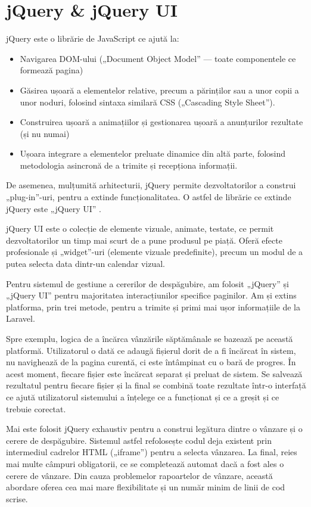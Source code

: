 \section{jQuery \& jQuery UI}

	jQuery este o librărie de JavaScript ce ajută la: \cite{jquery}
	\begin{itemize}
		\item Navigarea DOM-ului („Document Object Model” --- toate componentele ce formează pagina)
		\item Găsirea ușoară a elementelor relative, precum a părinților sau a unor copii a unor noduri, folosind sintaxa similară CSS („Cascading Style Sheet”).
		\item Construirea ușoară a animațiilor și gestionarea ușoară a anunțurilor rezultate (și nu numai)
		\item Ușoara integrare a elementelor preluate dinamice din altă parte, folosind metodologia asincronă de a trimite și recepționa informații.
	\end{itemize}

	De asemenea, mulțumită arhitecturii, jQuery permite dezvoltatorilor a construi „plug-in”-uri, pentru a extinde funcționalitatea.
	O astfel de librărie ce extinde jQuery este „jQuery UI” \cite{jquery_ui}.

	jQuery UI este o colecție de elemente vizuale, animate, testate, ce permit dezvoltatorilor un timp mai scurt de a pune produsul pe piață.
	Oferă efecte profesionale și „widget”-uri (elemente vizuale predefinite), precum un modul de a putea selecta data dintr-un calendar vizual.

	Pentru sistemul de gestiune a cererilor de despăgubire, am folosit „jQuery” și „jQuery UI” pentru majoritatea interacțiunilor specifice paginilor.
	Am și extins platforma, prin trei metode, pentru a trimite și primi mai ușor informațiile de la Laravel.

	Spre exemplu, logica de a încărca vânzările săptămânale se bazează pe această platformă.
	Utilizatorul o dată ce adaugă fișierul dorit de a fi încărcat în sistem, nu navighează de la pagina curentă, ci este întâmpinat cu o bară de progres.
	În acest moment, fiecare fișier este încărcat separat și preluat de sistem.
	Se salvează rezultatul pentru fiecare fișier și la final se combină toate rezultate într-o interfață ce ajută utilizatorul sistemului a înțelege ce a funcționat și ce a greșit și ce trebuie corectat.

	Mai este folosit jQuery exhaustiv pentru a construi legătura dintre o vânzare și o cerere de despăgubire.
	Sistemul astfel refolosește codul deja existent prin intermediul cadrelor HTML („iframe”) pentru a selecta vânzarea.
	La final, reies mai multe câmpuri obligatorii, ce se completează automat dacă a fost ales o cerere de vânzare.
	Din cauza problemelor rapoartelor de vânzare, această abordare oferea cea mai mare flexibilitate și un număr minim de linii de cod scrise.

